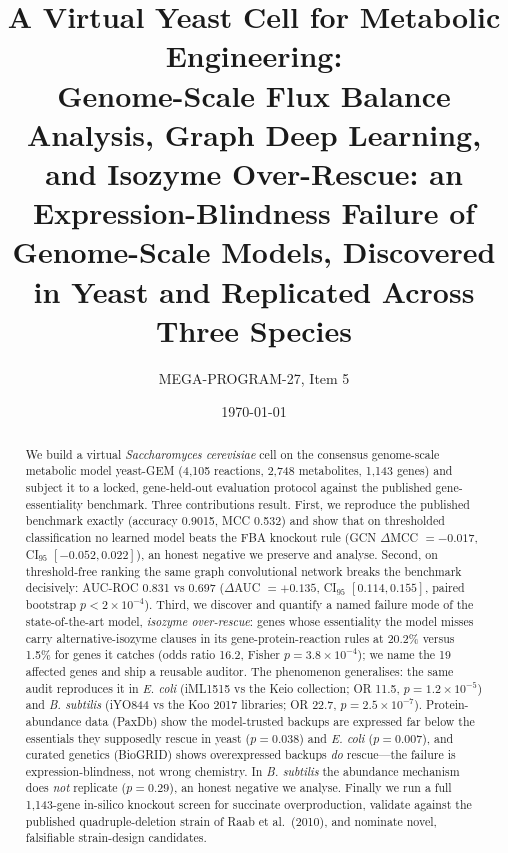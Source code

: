 \documentclass[12pt]{article}
\title{A Virtual Yeast Cell for Metabolic Engineering:\\[4pt]
{\large Genome-Scale Flux Balance Analysis, Graph Deep Learning, and
Isozyme Over-Rescue: an Expression-Blindness Failure of Genome-Scale
Models, Discovered in Yeast and Replicated Across Three Species}}
\author{MEGA-PROGRAM-27, Item 5}
\date{\today}
\begin{document}
\maketitle
\begin{abstract}
\noindent We build a virtual \emph{Saccharomyces cerevisiae} cell on the
consensus genome-scale metabolic model yeast-GEM (4{,}105 reactions,
2{,}748 metabolites, 1{,}143 genes) and subject it to a locked,
gene-held-out evaluation protocol against the published gene-essentiality
benchmark. Three contributions result. First, we reproduce the published
benchmark exactly (accuracy 0.9015, MCC 0.532) and show that on thresholded
classification no learned model beats the FBA knockout rule (GCN
$\Delta$MCC $=-0.017$, CI$_{95}$ $[-0.052, 0.022]$), an honest negative we
preserve and analyse. Second, on threshold-free ranking the same graph
convolutional network breaks the benchmark decisively: AUC-ROC 0.831 vs
0.697 ($\Delta$AUC $=+0.135$, CI$_{95}$ $[0.114, 0.155]$, paired bootstrap
$p<2\times10^{-4}$). Third, we discover and quantify a named failure mode
of the state-of-the-art model, \emph{isozyme over-rescue}: genes whose
essentiality the model misses carry alternative-isozyme clauses in its
gene-protein-reaction rules at 20.2\% versus 1.5\% for genes it catches
(odds ratio 16.2, Fisher $p=3.8\times10^{-4}$); we name the 19 affected
genes and ship a reusable auditor. The phenomenon generalises: the same
audit reproduces it in \emph{E. coli} (iML1515 vs the Keio collection;
OR 11.5, $p=1.2\times10^{-5}$) and \emph{B. subtilis} (iYO844 vs the
Koo 2017 libraries; OR 22.7, $p=2.5\times10^{-7}$). Protein-abundance
data (PaxDb) show the model-trusted backups are expressed far below the
essentials they supposedly rescue in yeast ($p=0.038$) and \emph{E.
coli} ($p=0.007$), and curated genetics (BioGRID) shows overexpressed
backups \emph{do} rescue---the failure is expression-blindness, not
wrong chemistry. In \emph{B. subtilis} the abundance mechanism does
\emph{not} replicate ($p=0.29$), an honest negative we analyse.
Finally we run a full 1{,}143-gene in-silico knockout screen for
succinate overproduction, validate against the published
quadruple-deletion strain of Raab et al.\ (2010), and nominate novel,
falsifiable strain-design candidates.
\end{abstract}
\tableofcontents
\newpage
\end{document}

